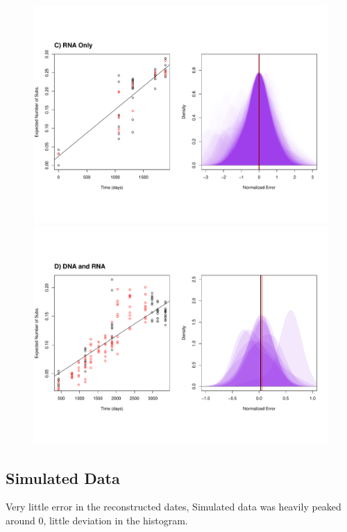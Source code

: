 \begin{figure}[!ht]
	\includegraphics[trim=0cm 0cm 0cm 7cm, clip=true,scale=0.25]{figures/ancre.pdf}\\
	\includegraphics[trim=0cm 4cm 0cm 7cm, clip=true,scale=0.25]{figures/lanl.pdf}
	\caption[Examples]{}
\end{figure}


\subsection{Simulated Data} \label{sec:sim_results}
Very little error in the reconstructed dates,  Simulated data was heavily peaked around 0, little deviation in the histogram. 

